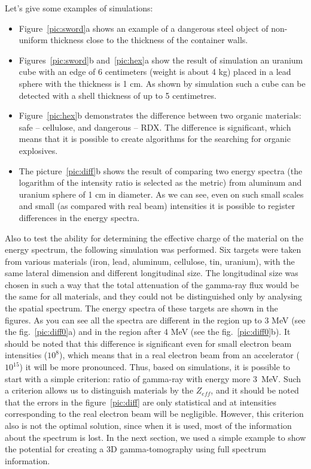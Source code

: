 \documentclass[a4paper]{panl}
\begin{document}
Let's give some examples of simulations:
\begin{itemize}
    \item Figure~\ref{pic:sword}a shows an example of a dangerous steel object of non-uniform thickness close to the thickness of the container walls. \item Figures~\ref{pic:sword}b and~\ref{pic:hex}a show the result of simulation an uranium cube with an edge of 6 centimeters (weight is about 4 kg) placed in a lead sphere with the thickness is 1 cm. As shown by simulation such a cube can be detected with a shell thickness of up to 5 centimetres.
    \item Figure~\ref{pic:hex}b demonstrates the difference between two organic materials: safe -- cellulose, and dangerous -- RDX. The difference is significant, which means that it is possible to create algorithms for the searching for organic explosives.
    \item The picture~\ref{pic:diff}b shows the result of comparing two energy spectra (the logarithm of the intensity ratio is selected as the metric) from aluminum and uranium sphere of 1 cm in diameter. As we can see, even on such small scales and small (as compared with real beam) intensities it is possible to register differences in the energy spectra.
\end{itemize}

Also to test the ability for determining the effective charge of the material on the energy spectrum, the following simulation was performed. Six targets were taken from various materials (iron, lead, aluminum, cellulose, tin, uranium), with the same lateral dimension and different longitudinal size. The longitudinal size was chosen in such a way that the total attenuation of the gamma-ray flux would be the same for all materials, and they could not be distinguished only by analysing the spatial spectrum.
The energy spectra of these targets are shown in the figures. As you can see all the spectra are different in the region up to 3 MeV (see the fig.~\ref{pic:diff0}a) and in the region after 4 MeV (see the fig.~\ref{pic:diff0}b). It should be noted that this difference is significant even for small electron beam intensities ($10^8$), which means that in a real electron beam from an accelerator ($10^{15}$) it will be more pronounced. Thus, based on simulations, it is possible to start with a simple criterion: ratio of gamma-ray with energy more 3~MeV. Such a criterion allows us to distinguish materials by the $Z_{eff}$, and it should be noted that the errors in the figure~\ref{pic:diff} are only statistical and at intensities corresponding to the real electron beam will be negligible. However, this criterion also is not the optimal solution, since when it is used, most of the information about the spectrum is lost. In the next section, we used a simple example to show the potential for creating a 3D gamma-tomography using full spectrum information.
\end{document}
